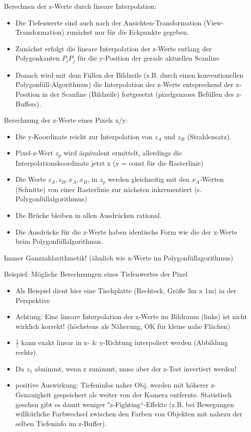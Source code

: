 \documentclass[10pt,landscape]{article}
\begin{document}
\begin{multicols}{3}
{  Berechnen der z-Werte durch lineare Interpolation:
  \begin{itemize}
    \item Die Tiefenwerte sind auch nach der Ansichten-Transformation (View-Transformation) zunächst nur für die Eckpunkte gegeben.
    \item Zunächst erfolgt die lineare Interpolation der z-Werte entlang der Polygonkanten $P_i P_j$ für die y-Position der gerade aktuellen Scanline
    \item Danach wird mit dem Füllen der Bildzeile (z.B. durch einen konventionellen Polygonfüll-Algorithmus) die Interpolation der z-Werte entsprechend der x-Position in der Scanline (Bildzeile) fortgesetzt (pixelgenaues Befüllen des z-Buffers).
  \end{itemize}
  
  Berechnung der z-Werte eines Pixels x/y:
  \begin{itemize}
    \item Die y-Koordinate reicht zur Interpolation von $z_A$ und $z_B$ (Strahlensatz).
    \item Pixel-z-Wert $z_p$ wird äquivalent ermittelt, allerdings die Interpolationskoordinate jetzt x (y = const für die Rasterlinie)
    \item Die Werte $z_A, z_B, x_A, x_B$, in $z_p$ werden gleichzeitig mit den $x_A$-Werten (Schnitte) von einer Rasterlinie zur nächsten inkrementiert (s. Polygonfüllalgorithmus)
    \item Die Brüche bleiben in allen Ausdrücken rational.
    \item Die Ausdrücke für die z-Werte haben identische Form wie die der x-Werte beim Polygonfüllalgorithmus.
  \end{itemize}
  
  Immer Ganzzahlarithmetik! (ähnlich wie x-Werte im Polygonfüllagorithmus)
  
  Beispiel: Mögliche Berechnungen eines Tiefenwertes der Pixel
  \begin{itemize}
    \item Als Beispiel dient hier eine Tischplatte (Rechteck, Größe 3m x 1m) in der Perspektive
    \item Achtung: Eine lineare Interpolation der z-Werte im Bildraum (links) ist nicht wirklich korrekt! (höchstens als Näherung, OK für kleine nahe Flächen)
    \item $\frac{1}{z}$ kann exakt linear in x- \& y-Richtung interpoliert werden (Abbildung rechts).
    \item Da $z_1$ abnimmt, wenn z zunimmt, muss aber der z-Test invertiert werden!
    \item positive Auswirkung: Tiefeninfos naher Obj. werden mit höherer z-Genauigkeit gespeichert als weiter von der Kamera entfernte. Statistisch gesehen gibt es damit weniger "z-Fighting“-Effekte (z.B. bei Bewegungen willkürliche Farbwechsel zwischen den Farben von Objekten mit nahezu der selben Tiefeninfo im z-Buffer).
  \end{itemize}
  
}
\end{multicols}
\end{document}
